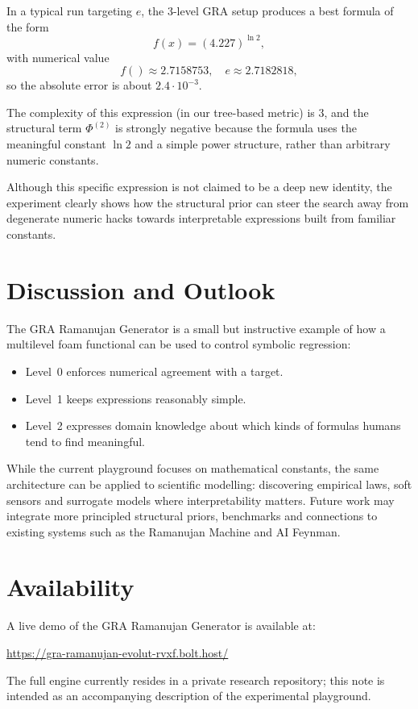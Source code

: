 \documentclass[11pt]{article}
\begin{document}
In a typical run targeting $e$, the 3-level GRA setup produces a best formula of the form
\[
  f(x) = (4.227)^{\ln 2},
\]
with numerical value
\[
  f() \approx 2.7158753,\quad
  e \approx 2.7182818,
\]
so the absolute error is about $2.4 \cdot 10^{-3}$.

The complexity of this expression (in our tree-based metric) is $3$, and the structural term $\Phi^{(2)}$ is strongly negative because the formula uses the meaningful constant $\ln 2$ and a simple power structure, rather than arbitrary numeric constants.

Although this specific expression is not claimed to be a deep new identity, the experiment clearly shows how the structural prior can steer the search away from degenerate numeric hacks towards interpretable expressions built from familiar constants.

\section{Discussion and Outlook}

The GRA Ramanujan Generator is a small but instructive example of how a multilevel foam functional can be used to control symbolic regression:
\begin{itemize}
  \item Level~0 enforces numerical agreement with a target.
  \item Level~1 keeps expressions reasonably simple.
  \item Level~2 expresses domain knowledge about which kinds of formulas humans tend to find meaningful.
\end{itemize}

While the current playground focuses on mathematical constants, the same architecture can be applied to scientific modelling:
discovering empirical laws, soft sensors and surrogate models where interpretability matters.
Future work may integrate more principled structural priors, benchmarks and connections to existing systems such as the Ramanujan Machine and AI Feynman.

\section*{Availability}

A live demo of the GRA Ramanujan Generator is available at:
\begin{center}
\url{https://gra-ramanujan-evolut-rvxf.bolt.host/}
\end{center}
The full engine currently resides in a private research repository; this note is intended as an accompanying description of the experimental playground.
\end{document}
